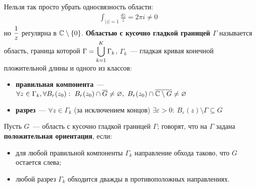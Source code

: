 \note
Нельзя так просто убрать односвязность области:
\begin{align*}
  \int_{\left| z \right| = 1} \frac{dz}{z} = 2 \pi i \neq 0
\end{align*}
но $\displaystyle \frac{1}{z}$ регулярна в $\mathbb{C} \setminus \{0\}$.
\Def
\textbf{Областью с кусочно гладкой границей $\Gamma$} называется область,
граница которой $\Gamma = \displaystyle \bigcup_{k=1}^K\Gamma_k$, $\Gamma_k$~--- гладкая
кривая конечной пложительной длины и одного из классов:
\begin{itemize}
    \item \textbf{правильная компонента}~--- $\forall z \in \Gamma_k, \forall
    B_r(z_0): \ B_r(z_0)\cap \overline{G} \neq \varnothing, \ B_r(z_0) \cap
    \overline{\mathbb{C}\setminus G} \neq \varnothing$
    \item \textbf{разрез}~--- $\forall z \in \Gamma_k$ (за исключением концов)
    $\exists \varepsilon > 0: \ B_{\varepsilon}(z) \setminus \Gamma \subseteq G$
\end{itemize}
\Def
Пусть $G$~--- область с кусочно гладкой границей $\Gamma$; говорят, что на
$\Gamma$ задана \textbf{положительная ориентация}, если:
\begin{itemize}
    \item для любой правильной компоненты $\Gamma_k$ направление обхода таково,
    что $G$ остается слева;
    \item любой разрез $\Gamma_k$ обходится дважды в противоположных
    направлениях.
\end{itemize}

